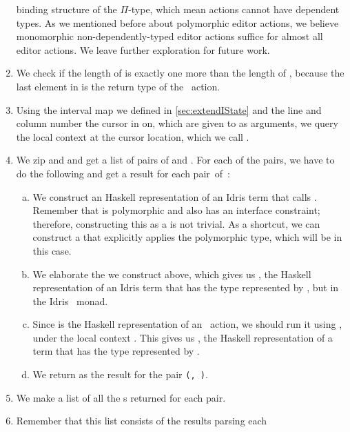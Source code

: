 \begin{enumerate}
{    binding structure of the $\Pi$-type, which mean  actions
    cannot have dependent types. As we mentioned before about polymorphic
    editor actions, we believe monomorphic non-dependently-typed editor actions
    suffice for almost all editor actions. We leave further exploration for
    future work.}
  \item We check if the length of  is exactly one more than the
    length of , because the last element in  is the
    return type of the \Elab\ action.
  \item Using the interval map we defined in \autoref{sec:extendIState} and the
    line and column number the cursor in on, which are given to 
    as arguments, we query the local context at the cursor location, which we
    call .
  \item We zip  and  and get a list of pairs of
     and .
    For each of the pairs, we have to do the following and get a result for
    each \mbox{pair of }:
    \begin{enumerate}[(a)]
      \item \label{item:fromEditor} We construct an Haskell representation of an
        Idris term that calls . Remember that  is
        polymorphic and also has an interface constraint; therefore,
        constructing this as a  is not trivial.  As a shortcut, we can
        construct a  that explicitly applies the polymorphic type,
        which will be  in this case.
      \item We elaborate the  we construct above, which gives us
        , the Haskell representation of an Idris term that has the type
        represented by , but in the Idris \Elab\ monad.
      \item Since  is the Haskell representation of an \Elab\ action, we
        should run it using , under the local context
        . This gives us , the Haskell representation of a term
        that has the type represented by .
      \item We return  as the result for the pair
        \texttt{(, )}.
    \end{enumerate}
  \item We make a list of all the s returned for each pair.
  \item Remember that this list consists of the results parsing each

\end{enumerate}
